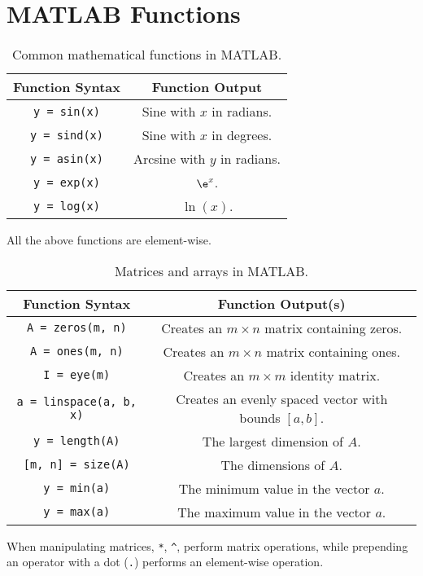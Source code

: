 \documentclass{article}
\begin{document}
\section{MATLAB Functions}
\begin{table}[H]
    \centering
    \begin{tabular}{c c}
        \toprule
        Function Syntax         & Function Output                \\
        \midrule
        \lstinline!y = sin(x)!  & Sine with \(x\) in radians.    \\
        \lstinline!y = sind(x)! & Sine with \(x\) in degrees.    \\
        \lstinline!y = asin(x)! & Arcsine with \(y\) in radians. \\
        \lstinline!y = exp(x)!  & \(\e^x\).                      \\
        \lstinline!y = log(x)!  & \(\ln{\left( x \right)}\).     \\
        \bottomrule
    \end{tabular}
    \caption{Common mathematical functions in MATLAB.}
\end{table}
All the above functions are element-wise.
\begin{table}[H]
    \centering
    \begin{tabular}{c c}
        \toprule
        Function Syntax                   & Function Output(s)                                                 \\
        \midrule
        \lstinline!A = zeros(m, n)!       & Creates an \(m \times n\) matrix containing zeros.                 \\
        \lstinline!A = ones(m, n)!        & Creates an \(m \times n\) matrix containing ones.                  \\
        \lstinline!I = eye(m)!            & Creates an \(m \times m\) identity matrix.                         \\
        \lstinline!a = linspace(a, b, x)! & Creates an evenly spaced vector with bounds \(\left[a, b\right]\). \\
        \lstinline!y = length(A)!         & The largest dimension of \(A\).                                    \\
        \lstinline![m, n] = size(A)!      & The dimensions of \(A\).                                           \\
        \lstinline!y = min(a)!            & The minimum value in the vector \(a\).                             \\
        \lstinline!y = max(a)!            & The maximum value in the vector \(a\).                             \\
        \bottomrule
    \end{tabular}
    \caption{Matrices and arrays in MATLAB.}
\end{table}
When manipulating matrices, \verb!*!, \verb!^!, perform matrix operations, while prepending an operator with a dot (\verb!.!) performs an element-wise operation.
\end{document}
